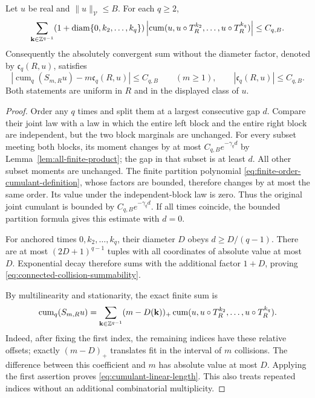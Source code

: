 \begin{proposition}
\label{prop:connected-collision-summability}
Let $u$ be real and $\|u\|_{\mathcal V}\le B$. For each $q\ge2$,
\begin{equation}\label{eq:connected-collision-summability}
 \sum_{\mathbf k\in\Z^{q-1}}
 (1+\operatorname{diam}\{0,k_2,\ldots,k_q\})
 \left|\operatorname{cum}(u,u\circ T_R^{k_2},\ldots,
                                      u\circ T_R^{k_q})\right|
 \le C_{q,B}.
\end{equation}
Consequently the absolutely convergent sum without the diameter
factor, denoted by $\mathfrak c_q(R,u)$, satisfies
\begin{equation}\label{eq:cumulant-linear-length}
 \left|\operatorname{cum}_q(S_{m,R}u)-m\mathfrak c_q(R,u)\right|
                \le C_{q,B}\qquad(m\ge1),
 \qquad |\mathfrak c_q(R,u)|\le C_{q,B}.
\end{equation}
Both statements are uniform in $R$ and in the displayed class of $u$.
\end{proposition}
\begin{proof}
Order any $q$ times and split them at a largest consecutive gap $d$.
Compare their joint law with a law in which the entire left block and
the entire right block are independent, but the two block marginals
are unchanged. For every subset meeting both blocks, its moment
changes by at most $C_{q,B}e^{-\gamma_qd}$ by
Lemma~\ref{lem:all-finite-product}; the gap in that subset is at least
$d$. All other subset moments are unchanged. The finite partition
polynomial \eqref{eq:finite-order-cumulant-definition}, whose factors
are bounded, therefore changes by at most the same order. Its value
under the independent-block law is zero. Thus the original joint
cumulant is bounded by $C_{q,B}e^{-\gamma_qd}$. If all times coincide,
the bounded partition formula gives this estimate with $d=0$.

For anchored times $0,k_2,\ldots,k_q$, their diameter $D$ obeys
$d\ge D/(q-1)$. There are at most $(2D+1)^{q-1}$ tuples with all
coordinates of absolute value at most $D$. Exponential decay therefore
sums with the additional factor $1+D$, proving
\eqref{eq:connected-collision-summability}.

By multilinearity and stationarity, the exact finite sum is
\[
 \operatorname{cum}_q(S_{m,R}u)
 =\sum_{\mathbf k\in\mathbb Z^{q-1}}(m-D(\mathbf k))_+
   \operatorname{cum}(u,u\circ T_R^{k_2},\ldots,u\circ T_R^{k_q}).
\]
Indeed, after fixing the first index, the remaining indices have these
relative offsets; exactly $(m-D)_+$ translates fit in the interval of
$m$ collisions. The difference between this coefficient and $m$ has
absolute value at most $D$. Applying the first assertion proves
\eqref{eq:cumulant-linear-length}. This also treats repeated indices
without an additional combinatorial multiplicity.
\end{proof}

